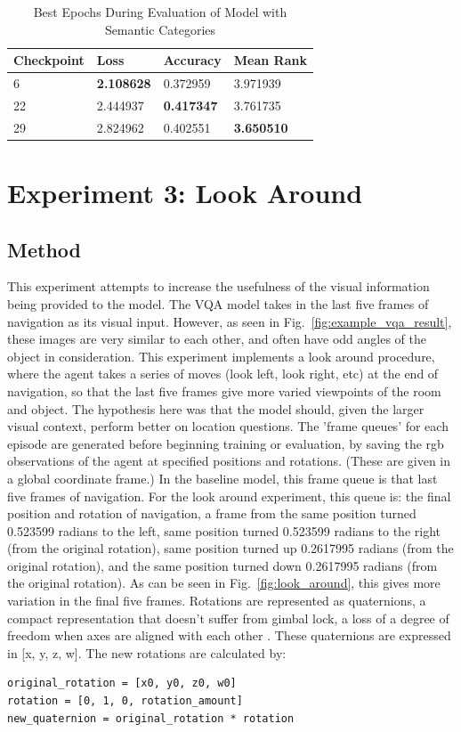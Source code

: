\begin{table}[h]
\centering
\caption{Best Epochs During Evaluation of Model with Semantic Categories}
\begin{tabular}{l | l | l | l}
Checkpoint & Loss & Accuracy & Mean Rank \\
\hline
6 & \textbf{2.108628} & 0.372959 & 3.971939 \\
22 & 2.444937 & \textbf{0.417347} & 3.761735 \\
29 & 2.824962 & 0.402551 & \textbf{3.650510} 
\end{tabular}
\label{tab:best_category}
\end{table}

\section{Experiment 3: Look Around}
\label{sec:exp_3}
\subsection{Method}
This experiment attempts to increase the usefulness of the visual information being provided to the model. The VQA model takes in the last five frames of navigation as its visual input. However, as seen in Fig.~\ref{fig:example_vqa_result}, these images are very similar to each other, and often have odd angles of the object in consideration. This experiment implements a look around procedure, where the agent takes a series of moves (look left, look right, etc) at the end of navigation, so that the last five frames give more varied viewpoints of the room and object. The hypothesis here was that the model should, given the larger visual context, perform better on location questions. \newline
The 'frame queues' for each episode are generated before beginning training or evaluation, by saving the rgb observations of the agent at specified positions and rotations. (These are given in a global coordinate frame.) In the baseline model, this frame queue is that last five frames of navigation. For the look around experiment, this queue is: the final position and rotation of navigation, a frame from the same position turned 0.523599 radians to the left, same position turned 0.523599 radians to the right (from the original rotation), same position turned up 0.2617995 radians (from the original rotation), and the same position turned down 0.2617995 radians (from the original rotation). As can be seen in Fig.~\ref{fig:look_around}, this gives more variation in the final five frames. \newline
Rotations are represented as quaternions, a compact representation that doesn't suffer from gimbal lock, a loss of a degree of freedom when axes are aligned with each other \cite{quaternions}.  These quaternions are expressed in [x, y, z, w]. The new rotations are calculated by: \begin{lstlisting}
original_rotation = [x0, y0, z0, w0] 
rotation = [0, 1, 0, rotation_amount] 
new_quaternion = original_rotation * rotation\end{lstlisting}

